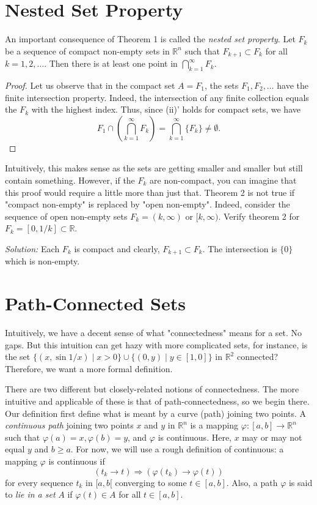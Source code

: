 \documentclass[11pt]{article}
\theoremstyle{definition}
\newcommand{\R}{\mathbb{R}}                      %
\begin{document}
\section{Nested Set Property}
An important consequence of Theorem 1 is called the \textit{nested set property}.
\theorem Let $F_k$ be a sequence of compact non-empty sets in $\R^n$ such that $F_{k+1}\subset F_k$ for all $k=1,2,\dots$. Then there is at least one point in $\bigcap_{k=1}^\infty F_k$.
\begin{proof}
    Let us observe that in the compact set $A=F_1$, the sets $F_1,F_2,\dots$ have the finite intersection property. Indeed, the intersection of any finite collection equals the $F_k$ with the highest index. Thus, since (ii)' holds for compact sets, we have 
    $$
    F_1\cap \left(\bigcap_{k=1}^\infty F_k\right)=\bigcap_{k=1}^\infty\{F_k\}\neq\emptyset.
    $$
\end{proof}
    Intuitively, this makes sense as the sets are getting smaller and smaller but still contain something. However, if the $F_k$ are non-compact, you can imagine that this proof would require a little more than just that.
\note Theorem 2 is not true if "compact non-empty" is replaced by "open non-empty". Indeed, consider the sequence of open non-empty sets $F_k=(k,\infty)$ or $[k,\infty)$.
    \ex Verify theorem 2 for $F_k=[0,1/k]\subset \R$.

    \textit{Solution:} Each $F_k$ is compact and clearly, $F_{k+1}\subset F_k$. The intersection is $\{0\}$ which is non-empty.
\section{Path-Connected Sets}
Intuitively, we have a decent sense of what "connectedness" means for a set. No gaps. But this intuition can get hazy with more complicated sets, for instance, is the set $\{(x,\sin 1/x)\;|\;x>0\}\cup\{(0,y)\;|\;y\in[1,0]\}$ in $\R^2$ connected? Therefore, we want a more formal definition.

There are two different but closely-related notions of connectedness. The more intuitive and applicable of these is that of path-connectedness, so we begin there. Our definition first define what is meant by a curve (path) joining two points.
 A \textit{continuous path} joining two points $x$ and $y$ in $\R^n$ is a mapping $\varphi:[a,b]\to\R^n$ such that $\varphi(a)=x, \varphi(b)=y$, and $\varphi$ is continuous. Here, $x$ may or may not equal $y$ and $b\geq a$.
\note For now, we will use a rough definition of continuous: a mapping $\varphi$ is continuous if 
$$
(t_k\to t)\Rightarrow (\varphi(t_k)\to\varphi(t))
$$
for every sequence $t_k$ in $[a,b[$ converging to some $t\in[a,b]$. Also, a path $\varphi$ is said to \textit{lie in a set} $A$ if $\varphi(t)\in A$ for all $t\in[a,b]$.
\end{document}
